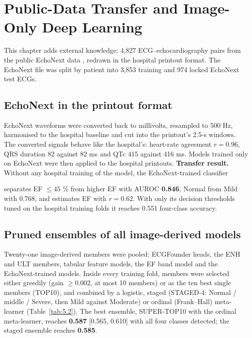 \chapter{Public-Data Transfer and Image-Only Deep Learning}\label{ch:5}

This chapter adds external knowledge: 4,827 ECG--echocardiography pairs from the public EchoNext data \cite{ref23}, redrawn in the hospital printout format. The EchoNext file was split by patient into 3,853 training and 974 locked EchoNext test ECGs.

\section{EchoNext in the printout format}\label{sec:5.1}



EchoNext waveforms were converted back to millivolts, resampled to 500 Hz, harmonised to the hospital baseline and cut into the printout's 2.5-s windows. The converted signals behave like the hospital's: heart-rate agreement $r=0.96$, QRS duration 82 against 82 ms and QTc 415 against 416 ms. Models trained only on EchoNext were then applied to the hospital printouts. \textbf{Transfer result.} Without any hospital training of the model, the EchoNext-trained classifier

separates EF $\le45$ \% from higher EF with AUROC \textbf{0.846}, Normal from Mild with 0.768, and estimates EF with $ r=0.62$. With only its decision thresholds tuned on the hospital training folds it reaches 0.551 four-class accuracy.

\section{Pruned ensembles of all image-derived models}\label{sec:5.2}



Twenty-one image-derived members were pooled: ECGFounder heads, the ENH and ULT members, tabular feature models, the EF band model and the EchoNext-trained models. Inside every training fold, members were selected either greedily (gain $\ge0.002$, at most 10 members) or as the ten best single members (TOP10), and combined by a logistic, staged (STAGED-4: Normal / middle / Severe, then Mild against Moderate) or ordinal (Frank--Hall) meta-learner (Table~\ref{tab:5.2}). The best ensemble, SUPER-TOP10 with the ordinal meta-learner, reaches \textbf{0.587} [0.565, 0.610] with all four classes detected; the staged ensemble reaches \textbf{0.585}.

